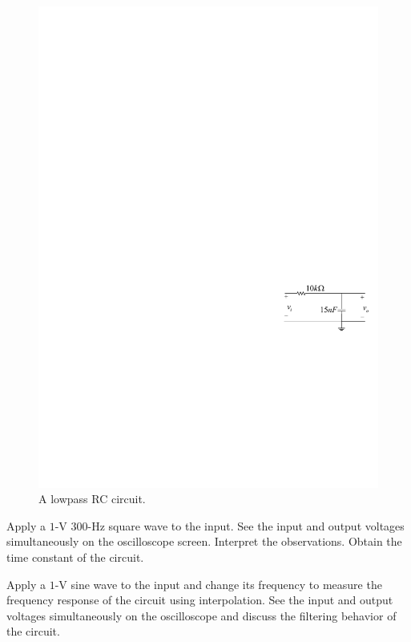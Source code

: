 \documentclass[11pt]{article}
\begin{document}
\begin{question}


\begin{figure}[H]
\centering
\includegraphics[scale=1.2,angle=0]{Fig/cir2.pdf}
\caption{A lowpass RC circuit.} \label{fig:cir2}
\end{figure}

\begin{subquestion}{Apply a $1$-V $300$-Hz square wave to the input. See the input and output voltages simultaneously on the oscilloscope screen. Interpret the observations. Obtain the time constant of the circuit.} 
\answer{}
\end{subquestion}

\begin{subquestion}{Apply a $1$-V sine wave to the input and change its frequency to measure the frequency response of the circuit using interpolation. See the input and output voltages simultaneously on the oscilloscope and discuss the filtering behavior of the circuit.} 
\answer{}
\end{subquestion}


\end{question}
\end{document}

